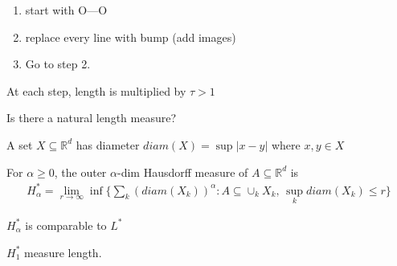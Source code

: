 \begin{example}
	\begin{enumerate}
		\item start with O---O
		\item replace every line with bump (add images)
		\item Go to step 2.
	\end{enumerate}
	At each step, length is multiplied by $\tau > 1$
\end{example}
Is there a natural length measure?

\begin{definition}
	A set $X \subseteq \mathbb{R}^d$ has diameter $diam(X) = \sup|x - y |$ where $x, y \in X$
\end{definition}

\begin{definition}
	For $\alpha \geq 0$, the outer $\alpha$-dim Hausdorff measure of $A \subseteq \mathbb{R}^d$ is
	\begin{align*}
		H_{\alpha}^* = \lim_{r \to \infty} \inf\{ \sum_{k} \left(diam(X_{k}) \right)^{\alpha} : A \subseteq \cup_{k} X_k, \,
		\sup_{k} diam(X_k) \leq r \}
	\end{align*}

	$H_{\alpha}^*$ is comparable to $L^*$

	$H_{1}^*$ measure length.
\end{definition}

